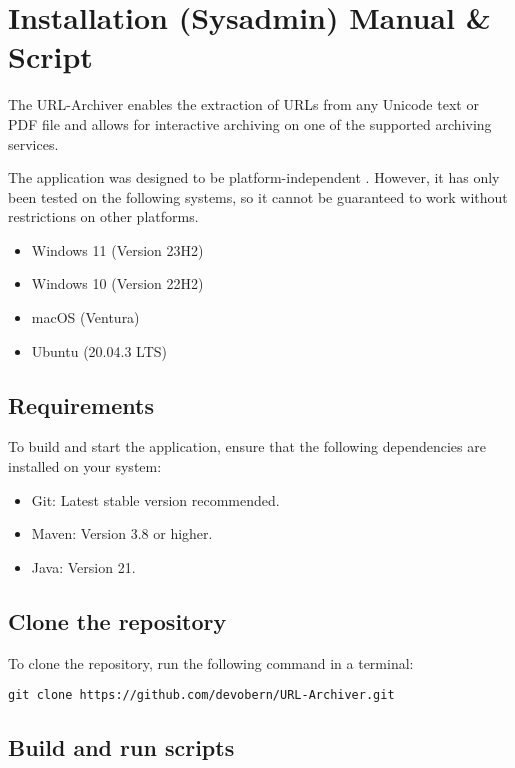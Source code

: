 
\section{Installation (Sysadmin) Manual \& Script} \label{sec::installation_manual}
The URL-Archiver enables the extraction of URLs from any Unicode text or PDF file and allows for interactive archiving
on one of the supported archiving services.
\begin{bfhWarnBox}
The application was designed to be platform-independent . However, it has only been tested on the following systems, so it cannot be guaranteed to work without restrictions on other platforms.
\begin{itemize}
	\item Windows 11 (Version 23H2)
	\item Windows 10 (Version 22H2)
	\item macOS (Ventura)
	\item Ubuntu (20.04.3 LTS)
\end{itemize}
\end{bfhWarnBox}

\subsection{Requirements}

To build and start the application, ensure that the following dependencies are installed on your system:
\begin{itemize}
	\item Git: Latest stable version recommended.
	\item Maven: Version 3.8 or higher.
	\item Java: Version 21.
\end{itemize}

\subsection{Clone the repository}

To clone the repository, run the following command in a terminal:

\begin{lstlisting}[numbers=none]
git clone https://github.com/devobern/URL-Archiver.git
\end{lstlisting}

\subsection{Build and run scripts}

